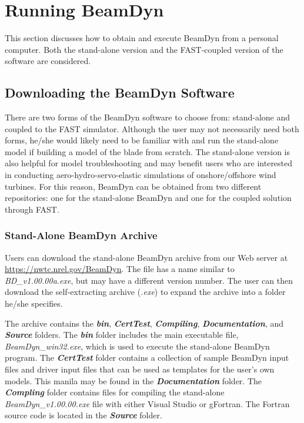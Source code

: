 \chapter{Running BeamDyn}
\label{sec:Run}
This section discusses how to obtain and execute BeamDyn from a personal computer. 
Both the stand-alone version and the FAST-coupled version of the software are considered.

\section{Downloading the BeamDyn Software}
There are two forms of the BeamDyn software to choose from: stand-alone and coupled to the FAST simulator. 
Although the user may not necessarily need both forms, he/she would likely need to be familiar with and run the stand-alone model if building a model of the blade from scratch. 
The stand-alone version is also helpful for model troubleshooting and may benefit users who are interested in conducting aero-hydro-servo-elastic simulations of onshore/offshore wind turbines. 
For this reason, BeamDyn can be obtained from two different repositories: one for the stand-alone BeamDyn and one for the coupled solution through FAST.

\subsection{Stand-Alone BeamDyn Archive}
Users can download the stand-alone BeamDyn archive from our Web server at \url{https://nwtc.nrel.gov/BeamDyn}. 
The file has a name similar to {\it BD\_v1.00.00a.exe}, but may have a different version number. The user can then download the self-extracting archive ({\it .exe}) to expand the archive into a folder he/she specifies.


The archive contains the \textbf{\textit{bin}}, \textbf{\textit{CertTest}}, \textbf{\textit{Compiling}}, \textbf{\textit{Documentation}}, and \textbf{\textit{Source}} folders. 
The \textbf{\textit{bin}} folder includes the main executable file, \textit{BeamDyn\_win32.exe}, which is used to execute the stand-alone BeamDyn program. 
The \textbf{\textit{CertTest}} folder contains a collection of sample BeamDyn input files and driver input files that can be used as templates for the user's own models. 
This manila may be found in the \textbf{\textit{Documentation}} folder. 
The \textbf{\textit{Compling}} folder contains files for compiling the stand-alone \textit{BeamDyn\_v1.00.00.exe} file with either Visual Studio or gFortran. 
The Fortran source code is located in the \textbf{\textit{Source}} folder.

